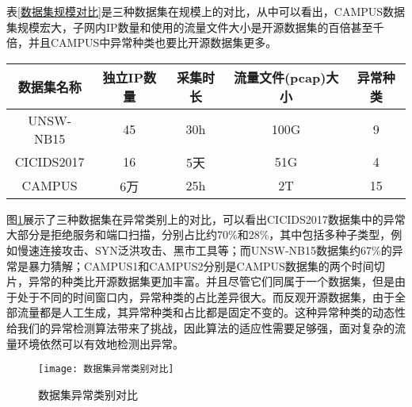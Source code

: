 表\ref{数据集规模对比}是三种数据集在规模上的对比，从中可以看出，CAMPUS数据集规模宏大，子网内IP数量和使用的流量文件大小是开源数据集的百倍甚至千倍，并且CAMPUS中异常种类也要比开源数据集更多。
\begin{table*}[h]
  \small
  \caption{数据集规模对比}
  \label{数据集规模对比}
  \centering
  \begin{tabular}{c|cccc}
  \toprule
  
   数据集名称 &  独立IP数量  & 采集时长 &  流量文件(pcap)大小 & 异常种类 \\
  \midrule
  
  UNSW-NB15 & 45 & 30h & 100G & 9   \\ 
  CICIDS2017 & 16 & 5天 & 51G & 4 \\
  CAMPUS & 6万 & 25h & 2T & 15\\
 
   \bottomrule
  
  \end{tabular}
  \end{table*}

图\ref{fig:数据集异常类别对比}展示了三种数据集在异常类别上的对比，可以看出CICIDS2017数据集中的异常大部分是拒绝服务和端口扫描，分别占比约70\%和28\%，其中包括多种子类型，例如慢速连接攻击、SYN泛洪攻击、黑市工具等；而UNSW-NB15数据集约67\%的异常是暴力猜解；CAMPUS1和CAMPUS2分别是CAMPUS数据集的两个时间切片，异常的种类比开源数据集更加丰富。并且尽管它们同属于一个数据集，但是由于处于不同的时间窗口内，异常种类的占比差异很大。而反观开源数据集，由于全部流量都是人工生成，其异常种类和占比都是固定不变的。这种异常种类的动态性给我们的异常检测算法带来了挑战，因此算法的适应性需要足够强，面对复杂的流量环境依然可以有效地检测出异常。

  \begin{figure}
    \centering
    \texttt{[image: 数据集异常类别对比]}
    \caption{数据集异常类别对比}
    \label{fig:数据集异常类别对比}
  \end{figure}



